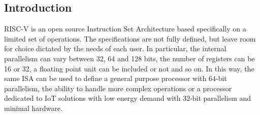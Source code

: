 \subsection{Introduction}
RISC-V is an open source Instruction Set Architecture based specifically on a limited set of operations. The specifications are not fully defined, but leave room for choice dictated by the needs of each user. In particular, the internal parallelism can vary between 32, 64 and 128 bits, the number of registers can be 16 or 32, a floating point unit can be included or not and so on. In this way, the same ISA can be used to define a general purpose processor with 64-bit parallelism, the ability to handle more complex operations or a processor dedicated to IoT solutions with low energy demand with 32-bit parallelism and minimal hardware.\\
